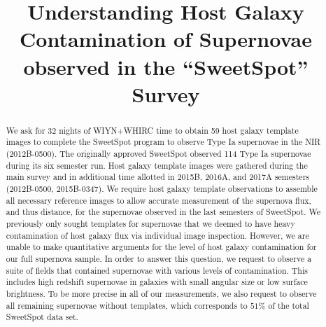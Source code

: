 \documentclass[11pt]{article}
\begin{document}
%
%

\title{Understanding Host Galaxy Contamination of Supernovae observed in the ``SweetSpot'' Survey}



%


\begin{abstract}

We ask for 32 nights of WIYN+WHIRC time to obtain 59 host galaxy template images
to complete the SweetSpot program to observe Type Ia supernovae in the NIR (2012B-0500).
The originally approved SweetSpot observed 114 Type Ia supernovae during its six semester run. 
Host galaxy template images were gathered during the main survey and in additional time allotted in 2015B, 2016A, and 2017A semesters (2012B-0500, 2015B-0347). 
We require host galaxy template observations to assemble all necessary reference images to allow accurate measurement of the supernova flux, and thus distance, for the supernovae observed in the last semesters of SweetSpot.
We previously only sought templates for supernovae that we deemed to have heavy contamination of host galaxy flux via individual image inspection.
However, we are unable to make quantitative arguments for the level of host galaxy contamination for our full supernova sample.
In order to answer this question, we request to observe a suite of fields that contained supernovae with various levels of contamination.   
This includes high redshift supernovae in galaxies with small angular size or low surface brightness.
To be more precise in all of our measurements, we also request to observe all remaining supernovae without templates, which corresponds to $51\%$ of the total SweetSpot data set.


\end{abstract}
\end{document}

